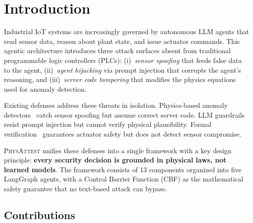 \documentclass[journal]{IEEEtran}
\newcommand{\physattest}{\textsc{PhysAttest}}
\begin{document}
\section{Introduction}
\label{sec:introduction}

Industrial IoT systems are increasingly governed by autonomous LLM agents that read sensor data, reason about plant state, and issue actuator commands. This agentic architecture introduces three attack surfaces absent from traditional programmable logic controllers (PLCs): (i)~\emph{sensor spoofing} that feeds false data to the agent, (ii)~\emph{agent hijacking} via prompt injection that corrupts the agent's reasoning, and (iii)~\emph{server code tampering} that modifies the physics equations used for anomaly detection.

Existing defenses address these threats in isolation. Physics-based anomaly detectors~\cite{goh2017dataset} catch sensor spoofing but assume correct server code. LLM guardrails~\cite{rebedea2023nemo} resist prompt injection but cannot verify physical plausibility. Formal verification~\cite{ames2017control} guarantees actuator safety but does not detect sensor compromise.

\physattest{} unifies these defenses into a single framework with a key design principle: \textbf{every security decision is grounded in physical laws, not learned models}. The framework consists of 13 components organized into five LangGraph agents, with a Control Barrier Function (CBF) as the mathematical safety guarantee that no text-based attack can bypass.

\subsection{Contributions}
\end{document}
